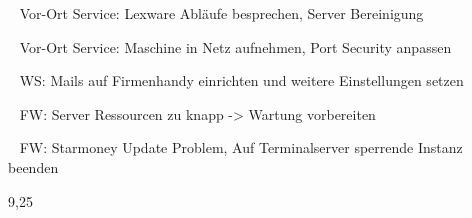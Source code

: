 {{	\textbullet~ Vor-Ort Service: Lexware Abläufe besprechen, Server Bereinigung \par
	\textbullet~ Vor-Ort Service: Maschine in Netz aufnehmen, Port Security anpassen\par
	\textbullet~ WS: Mails auf Firmenhandy einrichten und weitere Einstellungen setzen\par
	\textbullet~ FW: Server Ressourcen zu knapp -> Wartung vorbereiten\par
	\textbullet~ FW: Starmoney Update Problem, Auf Terminalserver sperrende Instanz beenden
	}{}{9,25}
}{}
\Unterschrift
\newpage
